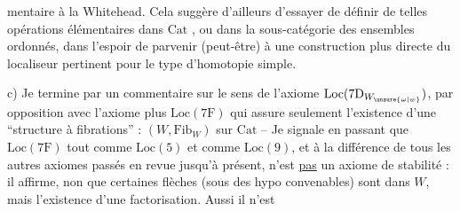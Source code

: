 %
%
mentaire à la Whitehead. Cela suggère d'ailleurs d'essayer de définir de telles opérations élémentaires dans $\mathrm{Cat}$  , ou  dans la  sous-catégorie des  ensembles ordonnés,  dans l'espoir de parvenir (peut-être) à une construction plus directe du localiseur pertinent pour le type d'homotopie simple.

c) Je termine par un commentaire sur le sens de l'axiome $\mathrm{Loc}(7\mathrm{D}_{W_{\unsure{\omega|w}}})$, par opposition avec l'axiome plus  $\mathrm{Loc}(7\mathrm{F})$ qui assure seulement l'existence d'une ``structure à fibrations'' : $(W,\mathrm{Fib}_W)$ sur $\mathrm{Cat}$ -- Je signale  en passant que $\mathrm{Loc}(7\mathrm{F})$ tout comme $\mathrm{Loc}(5)$ et comme $\mathrm{Loc}(9)$, et à la différence de tous les autres axiomes passés en revue jusqu'à présent, n'est \uline{pas} un axiome de stabilité : il affirme, non que certaines flèches (sous des hypo convenables) sont dans $W$, mais l'existence d'une factorisation. Aussi il n'est
